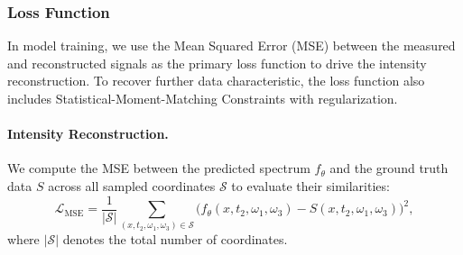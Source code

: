 \documentclass{optica-article}
\begin{document}
\subsubsection{Loss Function}
\label{subsec:loss_func}

In model training, we use the Mean Squared Error (MSE) between the measured and reconstructed signals as the primary loss function to drive the intensity reconstruction. To recover further data characteristic, the loss function also includes Statistical-Moment-Matching Constraints with regularization.

\paragraph{Intensity Reconstruction.}
We compute the MSE between the predicted spectrum $f_{\theta}$ and the ground truth data $S$ across all sampled coordinates $\mathcal{S}$ to evaluate their similarities:
\begin{equation}
    \mathcal{L}_{\mathrm{MSE}} = \frac{1}{|\mathcal{S}|} \sum_{(x, t_2, \omega_1, \omega_3) \in \mathcal{S}} \Big( f_{\theta}(x, t_2, \omega_1, \omega_3) - S(x, t_2, \omega_1, \omega_3) \Big)^2,
\end{equation}
where $|\mathcal{S}|$ denotes the total number of coordinates.
\end{document}
